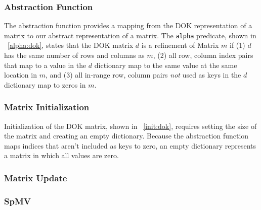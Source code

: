 \subsubsection{Abstraction Function}

The abstraction function provides a mapping from the DOK representation of a matrix to our abstract representation of a matrix.  The \texttt{alpha} predicate, shown in \figurename~\ref{alpha:dok}, states that the DOK matrix $d$ is a refinement of Matrix $m$ if (1) $d$ has the same number of rows and columns as $m$, (2) all row, column index pairs that map to a value in the $d$ dictionary map to the same value at the same location in $m$, and (3) all in-range row, column pairs \emph{not} used as keys in the $d$ dictionary map to zeros in $m$.

% 

\subsubsection{Matrix Initialization}

Initialization of the DOK matrix, shown in \figurename~\ref{init:dok}, requires setting the size of the matrix and creating an empty dictionary.  Because the abstraction function maps indices that aren't included as keys to zero, an empty dictionary represents a matrix in which all values are zero.

% 

\subsubsection{Matrix Update}

% 

\subsubsection{SpMV}